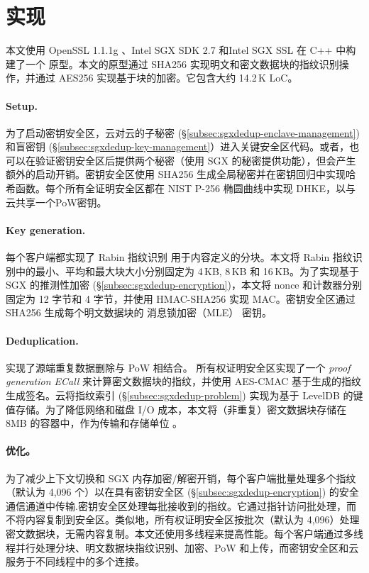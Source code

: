 \section{实现}
\label{sec:sgxdedup-implementation}

本文使用 OpenSSL 1.1.1g \cite{openssl}、Intel SGX SDK 2.7 \cite{sgx} 和Intel SGX SSL \cite{sgxssl} 在 C++ 中构建了一个 \sysnameS 原型。本文的原型通过 SHA256 实现明文和密文数据块的指纹识别操作，并通过 AES256 实现基于块的加密。它包含大约 14.2\,K LoC。

\paragraph*{Setup.} 
为了启动密钥安全区，云对云的子秘密 (\S\ref{subsec:sgxdedup-enclave-management}) 和盲密钥 (\S\ref{subsec:sgxdedup-key-management}）进入关键安全区代码。或者，\sysnameS 也可以在验证密钥安全区后提供两个秘密（使用 SGX \cite{sgx} 的秘密提供功能），但会产生额外的启动开销。密钥安全区使用 SHA256 生成全局秘密并在密钥回归中实现哈希函数。每个所有全证明安全区都在 NIST P-256 椭圆曲线中实现 DHKE，以与云共享一个PoW密钥。

\paragraph*{Key generation.} 每个客户端都实现了 Rabin 指纹识别 \cite{rabin81} 用于内容定义的分块。本文将 Rabin 指纹识别中的最小、平均和最大块大小分别固定为 4\,KB, 8\,KB 和 16\,KB。为了实现基于 SGX 的推测性加密 (\S\ref{subsec:sgxdedup-encryption})，本文将 nonce 和计数器分别固定为 12 字节和 4 字节，并使用 HMAC-SHA256 实现 MAC。密钥安全区通过 SHA256 生成每个明文数据块的 消息锁加密（MLE） 密钥。

\paragraph*{Deduplication.} \sysnameS 实现了源端重复数据删除与 PoW 相结合。 所有权证明安全区实现了一个 \textit{ proof generation ECall} 来计算密文数据块的指纹，并使用 AES-CMAC 基于生成的指纹生成签名。云将指纹索引 (\S\ref{subsec:sgxdedup-problem}) 实现为基于 LevelDB \cite{leveldb} 的键值存储。为了降低网络和磁盘 I/O 成本，本文将（非重复）密文数据块存储在 8MB 的容器中，作为传输和存储单位 \cite{lillibridge13}。

\paragraph*{优化。} 为了减少上下文切换和 SGX 内存加密/解密开销，每个客户端批量处理多个指纹（默认为 4,096 个）以在具有密钥安全区 (\S\ref{subsec:sgxdedup-encryption}) 的安全通信通道中传输.密钥安全区处理每批接收到的指纹。它通过指针访问批处理，而不将内容复制到安全区\cite{harnik2018SGX}。类似地，所有权证明安全区按批次（默认为 4,096）处理密文数据块，无需内容复制。本文还使用多线程来提高性能。每个客户端通过多线程并行处理分块、明文数据块指纹识别、加密、PoW 和上传，而密钥安全区和云服务于不同线程中的多个连接。